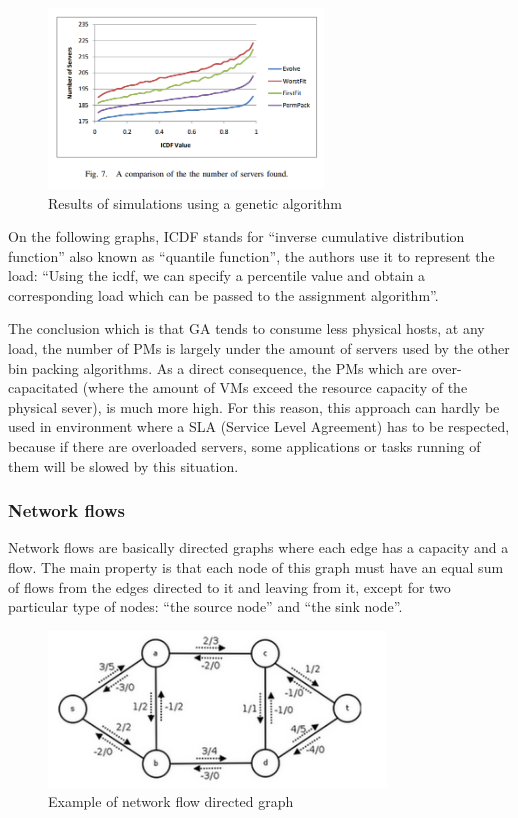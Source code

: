 \begin{figure}[H]
\begin{center}
	\includegraphics[width=0.65\textwidth]{./Images/geneticperf2.png}
	\caption{Results of simulations using a genetic algorithm\cite{algoGenetics1}}
\end{center}
\end{figure}

On the following graphs, ICDF stands for “inverse cumulative distribution
function” also known as “quantile function”, the authors use it to represent
the load: “Using the icdf, we can specify a percentile value and obtain a
corresponding load which can be passed to the assignment algorithm”.

The conclusion which is that GA tends to consume less physical hosts, at any
load, the number of PMs is largely under the amount of servers used by the
other bin packing algorithms. As a direct consequence, the PMs which are
over-capacitated (where the amount of VMs exceed the resource capacity of the
physical sever), is much more high. For this reason, this approach can hardly
be used in environment where a SLA (Service Level Agreement) has to be
respected, because if there are overloaded servers, some applications or tasks
running of them will be slowed by this situation.

\subsubsection{Network flows}

Network flows are basically directed graphs where each edge has a capacity and a flow.
The main property is that each node of this graph must have an equal sum of flows from
the edges directed to it and leaving from it, except for two particular type of nodes:
“the source node” and “the sink node”.

\begin{figure}[H]
\begin{center}
	\includegraphics[width=0.8\textwidth]{./Images/examplenetwork.png}
	\caption{Example of network flow directed graph}
\end{center}
\end{figure}

